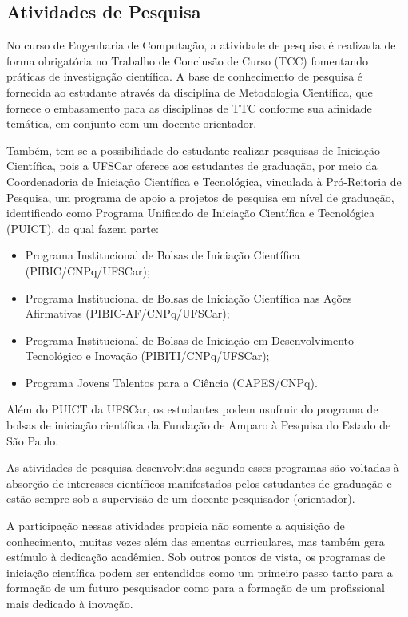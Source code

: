 \subsection{Atividades de Pesquisa}

No curso de Engenharia de Computação, a atividade de pesquisa é realizada de forma obrigatória no Trabalho de Conclusão de Curso (TCC) fomentando práticas de investigação científica. A base de conhecimento de pesquisa é fornecida ao estudante através da disciplina de Metodologia Científica, que fornece o embasamento para as disciplinas de TTC conforme sua afinidade temática, em conjunto com um docente orientador.

Também, tem-se a possibilidade do estudante realizar pesquisas de Iniciação Científica, pois a UFSCar oferece aos estudantes de graduação, por meio da Coordenadoria de Iniciação Científica e Tecnológica, vinculada à Pró-Reitoria de Pesquisa, um programa de apoio a projetos de pesquisa em nível de graduação, identificado como Programa Unificado de Iniciação Científica e Tecnológica (PUICT), do qual fazem parte:
\begin{itemize}
    \item Programa Institucional de Bolsas de Iniciação Científica (PIBIC/CNPq/UFSCar);
    \item Programa Institucional de Bolsas de Iniciação Científica nas Ações Afirmativas (PIBIC-AF/CNPq/UFSCar);
    \item Programa Institucional de Bolsas de Iniciação em Desenvolvimento Tecnológico e Inovação (PIBITI/CNPq/UFSCar);
    \item Programa Jovens Talentos para a Ciência (CAPES/CNPq).
\end{itemize}

Além do PUICT da UFSCar, os estudantes podem usufruir do programa de bolsas de iniciação científica da Fundação de Amparo à Pesquisa do Estado de São Paulo.

As atividades de pesquisa desenvolvidas segundo esses programas são voltadas à absorção de interesses científicos manifestados pelos estudantes de graduação e estão sempre sob a supervisão de um docente pesquisador (orientador).

A participação nessas atividades propicia não somente a aquisição de conhecimento, muitas vezes além das ementas curriculares, mas também gera estímulo à dedicação acadêmica. Sob outros pontos de vista, os programas de iniciação científica podem ser entendidos como um primeiro passo tanto para a formação de um futuro pesquisador como para a formação de um profissional mais dedicado à inovação.

